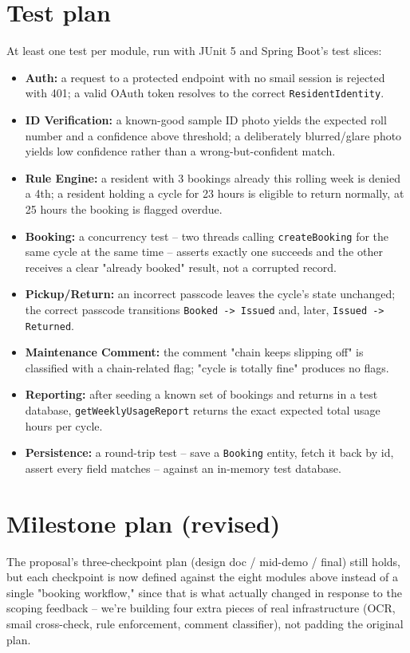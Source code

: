 \documentclass[11pt]{article}
\begin{document}
\section{Test plan}
At least one test per module, run with JUnit 5 and Spring Boot's test slices:
\begin{itemize}[leftmargin=*]
  \item \textbf{Auth:} a request to a protected endpoint with no smail session is rejected with 401; a valid OAuth token resolves to the correct \texttt{ResidentIdentity}.
  \item \textbf{ID Verification:} a known-good sample ID photo yields the expected roll number and a confidence above threshold; a deliberately blurred/glare photo yields low confidence rather than a wrong-but-confident match.
  \item \textbf{Rule Engine:} a resident with 3 bookings already this rolling week is denied a 4th; a resident holding a cycle for 23 hours is eligible to return normally, at 25 hours the booking is flagged overdue.
  \item \textbf{Booking:} a concurrency test -- two threads calling \texttt{createBooking} for the same cycle at the same time -- asserts exactly one succeeds and the other receives a clear "already booked" result, not a corrupted record.
  \item \textbf{Pickup/Return:} an incorrect passcode leaves the cycle's state unchanged; the correct passcode transitions \texttt{Booked -> Issued} and, later, \texttt{Issued -> Returned}.
  \item \textbf{Maintenance Comment:} the comment "chain keeps slipping off" is classified with a chain-related flag; "cycle is totally fine" produces no flags.
  \item \textbf{Reporting:} after seeding a known set of bookings and returns in a test database, \texttt{getWeeklyUsageReport} returns the exact expected total usage hours per cycle.
  \item \textbf{Persistence:} a round-trip test -- save a \texttt{Booking} entity, fetch it back by id, assert every field matches -- against an in-memory test database.
\end{itemize}

\section{Milestone plan (revised)}
The proposal's three-checkpoint plan (design doc / mid-demo / final) still holds, but each checkpoint is now defined against the eight modules above instead of a single "booking workflow," since that is what actually changed in response to the scoping feedback -- we're building four extra pieces of real infrastructure (OCR, smail cross-check, rule enforcement, comment classifier), not padding the original plan.
\end{document}
